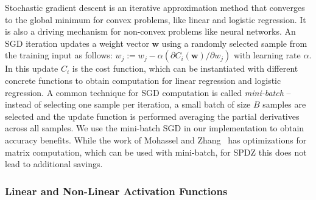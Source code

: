 \documentclass{article}
\begin{document}
Stochastic gradient descent is an iterative approximation method that converges to the global minimum for convex problems, like linear and logistic regression. It is also a driving mechanism for non-convex problems like neural networks. An SGD iteration updates a weight vector $\mathbf{w}$ using a randomly selected sample from the training input as follows: $w_j := w_j - \alpha ({\partial C_i(\mathbf{w})}/{\partial w_j})$ with learning rate $\alpha$. In this update $C_i$ is the cost function, which can be instantiated with different concrete functions to obtain computation for linear regression and logistic regression. A common technique for SGD
computation is called \emph{mini-batch} -- instead of selecting one sample per iteration, a small batch of size $B$ samples are selected and the update function is performed averaging the partial derivatives across all samples. We use the mini-batch SGD in our implementation to obtain accuracy benefits. While the work of Mohassel and Zhang~\cite{MZ17} has optimizations for matrix computation, which can be used with mini-batch, for 
SPDZ this does not lead to additional savings.
 

\subsubsection{Linear and Non-Linear Activation Functions}
\end{document}
